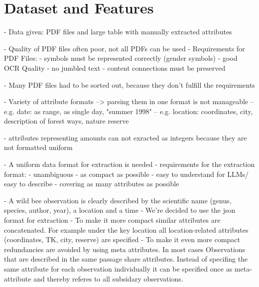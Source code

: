 \documentclass{article}
\begin{document}
\section{Dataset and Features}


- Data given: PDF files and large table with manually extracted attributes


- Quality of PDF files often poor, not all PDFs can be used
- Requirements for PDF Files:
    - symbols must be represented correctly (gender symbols)
    - good OCR Quality
    - no jumbled text
    - content connections must be preserved

- Many PDF files had to be sorted out, because they don't fulfill the requirements

- Variety of attribute formats --> parsing them in one format is not manageable
-- e.g. date: as range, as single day, "summer 1998"
-- e.g. location: coordinates, city, description of forest ways, nature reserve

- attributes representing amounts can not exracted as integers because they are not formatted uniform


- A uniform data format for extraction is needed
- requirements for the extraction format:
    - unambiguous
    - as compact as possible
    - easy to understand for LLMs/ easy to describe
    - covering as many attributes as possible

- A wild bee observation is clearly described by the scientific name (genus, species, author, year), a location and a time
- We're decided to use the json format for extraction
- To make it more compact similar attributes are concatenated. For example under the key location all location-related attributes (coordinates, TK, city, reserve) are specified
- To make it even more compact redundancies are avoided by using meta attributes. In most cases Observations that are described in the same passage share attributes. Instead of specifing the same attribute for each observation individually it can be specified once as meta-attribute and thereby referes to all subsidary observations.
\end{document}
